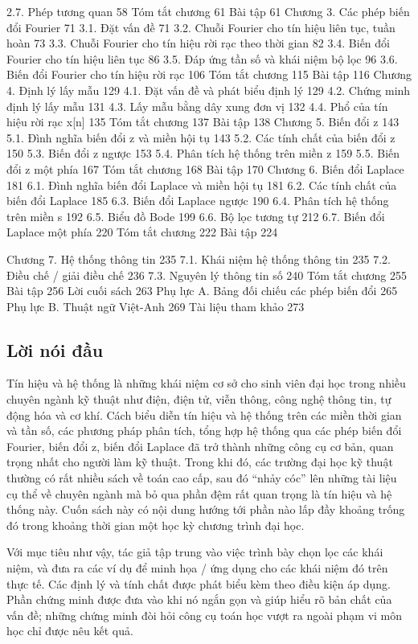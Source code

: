 \documentclass[
  10
]{article}
\begin{document}
2.7. Phép tương quan 58 Tóm tắt chương 61 Bài tập 61 Chương 3. Các phép
biến đổi Fourier 71 3.1. Đặt vấn đề 71 3.2. Chuỗi Fourier cho tín hiệu
liên tục, tuần hoàn 73 3.3. Chuỗi Fourier cho tín hiệu rời rạc theo thời
gian 82 3.4. Biến đổi Fourier cho tín hiệu liên tục 86 3.5. Đáp ứng tần
số và khái niệm bộ lọc 96 3.6. Biến đổi Fourier cho tín hiệu rời rạc 106
Tóm tắt chương 115 Bài tập 116 Chương 4. Định lý lấy mẫu 129 4.1. Đặt
vấn đề và phát biểu định lý 129 4.2. Chứng minh định lý lấy mẫu 131 4.3.
Lấy mẫu bằng dây xung đơn vị 132 4.4. Phổ của tín hiệu rời rạc x{[}n{]}
135 Tóm tắt chương 137 Bài tập 138 Chương 5. Biến đổi z 143 5.1. Đình
nghĩa biến đổi z và miền hội tụ 143 5.2. Các tính chất của biến đổi z
150 5.3. Biến đổi z ngược 153 5.4. Phân tích hệ thống trên miền z 159
5.5. Biến đổi z một phía 167 Tóm tắt chương 168 Bài tập 170 Chương 6.
Biến đổi Laplace 181 6.1. Đình nghĩa biến đổi Laplace và miền hội tụ 181
6.2. Các tính chất của biến đổi Laplace 185 6.3. Biến đổi Laplace ngược
190 6.4. Phân tích hệ thống trên miền s 192 6.5. Biểu đồ Bode 199 6.6.
Bộ lọc tương tự 212 6.7. Biến đổi Laplace một phía 220 Tóm tắt chương
222 Bài tập 224

Chương 7. Hệ thống thông tin 235 7.1. Khái niệm hệ thống thông tin 235
7.2. Điều chế / giải điều chế 236 7.3. Nguyên lý thông tin số 240 Tóm
tắt chương 255 Bài tập 256 Lời cuối sách 263 Phụ lực A. Bảng đối chiếu
các phép biến đổi 265 Phụ lực B. Thuật ngữ Việt-Anh 269 Tài liệu tham
khảo 273

\subsection{Lời nói đầu}\label{lux1eddi-nuxf3i-ux111ux1ea7u}

Tín hiệu và hệ thống là những khái niệm cơ sở cho sinh viên đại học
trong nhiều chuyên ngành kỹ thuật như điện, điện tử, viễn thông, công
nghệ thông tin, tự động hóa và cơ khí. Cách biểu diễn tín hiệu và hệ
thống trên các miền thời gian và tần số, các phương pháp phân tích, tổng
hợp hệ thống qua các phép biến đổi Fourier, biến đổi z, biến đổi Laplace
đã trở thành những công cụ cơ bản, quan trọng nhất cho người làm kỹ
thuật. Trong khi đó, các trường đại học kỹ thuật thường có rất nhiều
sách về toán cao cấp, sau đó ``nhảy cóc'' lên những tài liệu cụ thể về
chuyên ngành mà bỏ qua phần đệm rất quan trọng là tín hiệu và hệ thống
này. Cuốn sách này có nội dung hướng tới phần nào lấp đầy khoảng trống
đó trong khoảng thời gian một học kỳ chương trình đại học.

Với mục tiêu như vậy, tác giả tập trung vào việc trình bày chọn lọc các
khái niệm, và đưa ra các ví dụ để minh họa / ứng dụng cho các khái niệm
đó trên thực tế. Các định lý và tính chất được phát biểu kèm theo điều
kiện áp dụng. Phần chứng minh được đưa vào khi nó ngắn gọn và giúp hiểu
rõ bản chất của vấn đề; những chứng minh đòi hỏi công cụ toán học vượt
ra ngoài phạm vi môn học chỉ được nêu kết quả.
\end{document}
